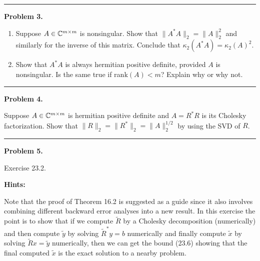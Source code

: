 \documentclass[10pt]{article}
\begin{document}


\vskip 1cm
\hrule
{\bf Problem 3.}

\begin{enumerate}
\item Suppose $A\in\mathbb{C}^{m\times m}$ is nonsingular.  Show that $\|A^*A\|_2 =
\|A\|_2^2$ and similarly for the inverse of this matrix.  Conclude that
$\kappa_2(A^*A) = \kappa_2(A)^2$.

\item Show that $A^*A$ is always hermitian positive definite, provided $A$ is
nonsingular.   Is the same true if rank$(A) < m$?  Explain why or why not.

\end{enumerate} 



\vskip 1cm
\hrule
{\bf Problem 4.}

Suppose $A\in\mathbb{C}^{m\times m}$ is hermitian positive definite
and $A=R^*R$ is its Cholesky factorization.  Show that $\|R\|_2 = \|R^*\|_2 =
\|A\|_2^{1/2}$ by using the SVD of $R$.



\vskip 1cm
\hrule
{\bf Problem 5.}

Exercise 23.2.  

{\bf Hints:}

Note that the proof of Theorem 16.2 is suggested as a guide since
it also involves combining different backward error analyses into a new result.
In this exercise the point is to show that if we compute $\tilde R$ by a Cholesky
decomposition (numerically) and then compute $\tilde y$ by solving $\tilde R^* y
= b$ numerically and finally compute $\tilde x$ by solving $\tilde R x = \tilde y$
numerically, then we can get the bound (23.6) showing that the final computed
$\tilde x$ is the exact solution to a nearby problem.  
\end{document}
